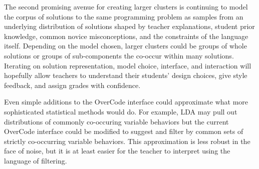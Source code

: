 \documentclass[12pt,twoside]{mitthesis}
\begin{document}


The second promising avenue for creating larger clusters is continuing to model the corpus of solutions to the same programming problem as samples from an underlying distribution of solutions shaped by teacher explanations, student prior knowledge, common novice misconceptions, and the constraints of the language itself. Depending on the model chosen, larger clusters could be groups of whole solutions or groups of sub-components the co-occur within many solutions. Iterating on solution representation, model choice, interface, and interaction will hopefully allow teachers to understand their students' design choices, give style feedback, and assign grades with confidence. 

Even simple additions to the OverCode interface could approximate what more sophisticated statistical methods would do. For example, LDA may pull out distributions of commonly co-occuring variable behaviors but the current OverCode interface could be modified to suggest and filter by common sets of strictly co-occurring variable behaviors. This approximation is less robust in the face of noise, but it is at least easier for the teacher to interpret using the language of filtering. %
\end{document}
